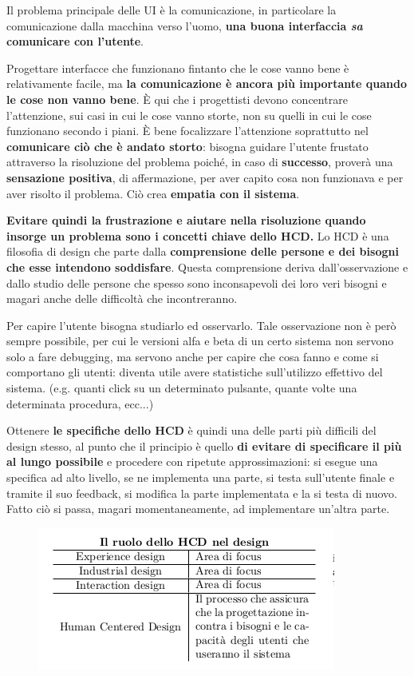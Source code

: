 \documentclass[a4paper,11pt,oneside]{book}
\begin{document}
Il problema principale delle UI è la comunicazione, in particolare la comunicazione dalla macchina verso l'uomo, \textbf{una buona interfaccia \textit{sa} comunicare con l'utente}.

Progettare interfacce che funzionano fintanto che le cose vanno bene è relativamente facile, ma \textbf{la comunicazione è ancora più importante quando le cose non vanno bene}. È qui che i progettisti devono concentrare l'attenzione, sui casi in cui le cose vanno storte, non su quelli in cui le cose funzionano secondo i piani. È bene focalizzare l'attenzione soprattutto nel \textbf{comunicare ciò che è andato storto}: bisogna guidare l'utente frustato attraverso la risoluzione del problema poiché, in caso di \textbf{successo}, proverà una \textbf{sensazione positiva}, di affermazione, per aver capito cosa non funzionava e per aver risolto il problema. Ciò crea \textbf{empatia con il sistema}.

\textbf{Evitare quindi la frustrazione e aiutare nella risoluzione quando insorge un problema sono i concetti chiave dello HCD.}
Lo HCD è una filosofia di design che parte dalla \textbf{comprensione delle persone e dei bisogni che esse intendono soddisfare}. Questa comprensione deriva dall'osservazione e dallo studio delle persone che spesso sono inconsapevoli dei loro veri bisogni e magari anche delle difficoltà che incontreranno.

Per capire l'utente bisogna studiarlo ed osservarlo. Tale osservazione non è però sempre possibile, per cui le versioni alfa e beta di un certo sistema non servono solo a fare debugging, ma servono anche per capire che cosa fanno e come si comportano gli utenti: diventa utile avere statistiche sull'utilizzo effettivo del sistema. (e.g. quanti click su un determinato pulsante, quante volte una determinata procedura, ecc...)

\pagebreak

Ottenere \textbf{le specifiche dello HCD} è quindi una delle parti più difficili del design stesso, al punto che il principio è quello \textbf{di evitare di specificare il più al lungo possibile} e procedere con ripetute approssimazioni: si esegue una specifica ad alto livello, se ne implementa una parte, si testa sull'utente finale e tramite il suo feedback, si modifica la parte implementata e la si testa di nuovo. Fatto ciò si passa, magari momentaneamente, ad implementare un'altra parte.

\begin{figure}[!h]
	\centering
	\includegraphics[scale=0.5]{immagini/HCD}
\end{figure}
\end{document}
